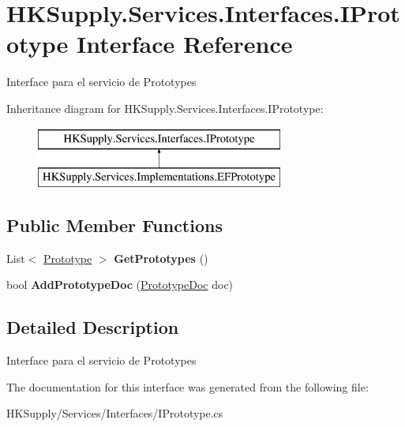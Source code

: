 \hypertarget{interface_h_k_supply_1_1_services_1_1_interfaces_1_1_i_prototype}{}\section{H\+K\+Supply.\+Services.\+Interfaces.\+I\+Prototype Interface Reference}
\label{interface_h_k_supply_1_1_services_1_1_interfaces_1_1_i_prototype}


Interface para el servicio de Prototypes  


Inheritance diagram for H\+K\+Supply.\+Services.\+Interfaces.\+I\+Prototype\+:\begin{figure}[H]
\begin{center}
\leavevmode
\includegraphics[height=2.000000cm]{interface_h_k_supply_1_1_services_1_1_interfaces_1_1_i_prototype}
\end{center}
\end{figure}
\subsection*{Public Member Functions}
\begin{DoxyCompactItemize}
\item 
\mbox{\label{interface_h_k_supply_1_1_services_1_1_interfaces_1_1_i_prototype_acfd1c25ec6852cbdf490f2109d9c9b7c}} 
List$<$ \mbox{\hyperlink{class_h_k_supply_1_1_models_1_1_prototype}{Prototype}} $>$ {\bfseries Get\+Prototypes} ()
\item 
\mbox{\label{interface_h_k_supply_1_1_services_1_1_interfaces_1_1_i_prototype_ab24012da7fcdbdde66a56473be2160b5}} 
bool {\bfseries Add\+Prototype\+Doc} (\mbox{\hyperlink{class_h_k_supply_1_1_models_1_1_prototype_doc}{Prototype\+Doc}} doc)
\end{DoxyCompactItemize}


\subsection{Detailed Description}
Interface para el servicio de Prototypes 



The documentation for this interface was generated from the following file\+:\begin{DoxyCompactItemize}
\item 
H\+K\+Supply/\+Services/\+Interfaces/I\+Prototype.\+cs\end{DoxyCompactItemize}
